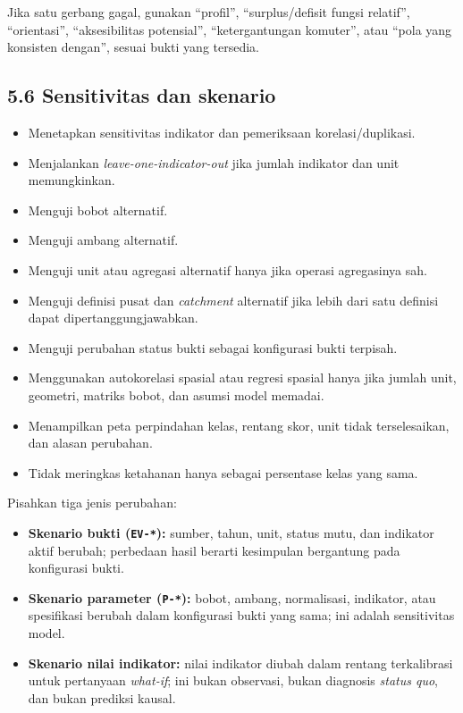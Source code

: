\documentclass[
  indonesian,
  11pt,
]{article}
\providecommand{\tightlist}{%
  \setlength{\itemsep}{0pt}\setlength{\parskip}{0pt}}
\renewcommand{\tightlist}{%
  \setlength{\itemsep}{0.22em}%
  \setlength{\parskip}{0pt}%
}
\begin{document}
Jika satu gerbang gagal, gunakan ``profil'', ``surplus/defisit fungsi
relatif'', ``orientasi'', ``aksesibilitas potensial'', ``ketergantungan
komuter'', atau ``pola yang konsisten dengan'', sesuai bukti yang
tersedia.

\subsection{5.6 Sensitivitas dan
skenario}\label{sensitivitas-dan-skenario}

\begin{itemize}
\tightlist
\item[$\square$]
  Menetapkan sensitivitas indikator dan pemeriksaan korelasi/duplikasi.
\item[$\square$]
  Menjalankan \emph{leave-one-indicator-out} jika jumlah indikator dan
  unit memungkinkan.
\item[$\square$]
  Menguji bobot alternatif.
\item[$\square$]
  Menguji ambang alternatif.
\item[$\square$]
  Menguji unit atau agregasi alternatif hanya jika operasi agregasinya
  sah.
\item[$\square$]
  Menguji definisi pusat dan \emph{catchment} alternatif jika lebih dari
  satu definisi dapat dipertanggungjawabkan.
\item[$\square$]
  Menguji perubahan status bukti sebagai konfigurasi bukti terpisah.
\item[$\square$]
  Menggunakan autokorelasi spasial atau regresi spasial hanya jika
  jumlah unit, geometri, matriks bobot, dan asumsi model memadai.
\item[$\square$]
  Menampilkan peta perpindahan kelas, rentang skor, unit tidak
  terselesaikan, dan alasan perubahan.
\item[$\square$]
  Tidak meringkas ketahanan hanya sebagai persentase kelas yang sama.
\end{itemize}

Pisahkan tiga jenis perubahan:

\begin{itemize}
\tightlist
\item[$\square$]
  \textbf{Skenario bukti (\texttt{EV-*}):} sumber, tahun, unit, status
  mutu, dan indikator aktif berubah; perbedaan hasil berarti kesimpulan
  bergantung pada konfigurasi bukti.
\item[$\square$]
  \textbf{Skenario parameter (\texttt{P-*}):} bobot, ambang,
  normalisasi, indikator, atau spesifikasi berubah dalam konfigurasi
  bukti yang sama; ini adalah sensitivitas model.
\item[$\square$]
  \textbf{Skenario nilai indikator:} nilai indikator diubah dalam
  rentang terkalibrasi untuk pertanyaan \emph{what-if}; ini bukan
  observasi, bukan diagnosis \emph{status quo}, dan bukan prediksi
  kausal.
\end{itemize}
\end{document}
